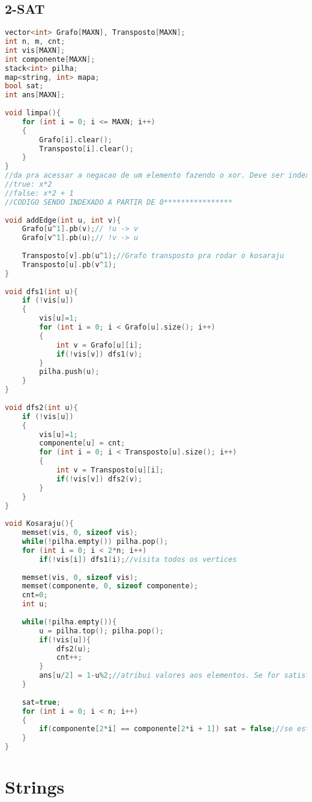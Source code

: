 \documentclass[12pt,a4paper,twoside]{report}
\begin{document}
\section{2-SAT}
\noindent\begin{lstlisting}[caption=2-SAT,language=C++]
vector<int> Grafo[MAXN], Transposto[MAXN];
int n, m, cnt;
int vis[MAXN];
int componente[MAXN];
stack<int> pilha;
map<string, int> mapa;
bool sat;
int ans[MAXN];
 
void limpa(){
    for (int i = 0; i <= MAXN; i++)
    {
        Grafo[i].clear();
        Transposto[i].clear();
    }  
}
//da pra acessar a negacao de um elemento fazendo o xor. Deve ser indexado como:
//true: x*2
//false: x*2 + 1
//CODIGO SENDO INDEXADO A PARTIR DE 0****************
 
void addEdge(int u, int v){
    Grafo[u^1].pb(v);// !u -> v
    Grafo[v^1].pb(u);// !v -> u
     
    Transposto[v].pb(u^1);//Grafo transposto pra rodar o kosaraju
    Transposto[u].pb(v^1);
}
 
void dfs1(int u){
    if (!vis[u])
    {
        vis[u]=1;
        for (int i = 0; i < Grafo[u].size(); i++)
        {
            int v = Grafo[u][i];
            if(!vis[v]) dfs1(v);
        }
        pilha.push(u);
    }  
}
 
void dfs2(int u){
    if (!vis[u])
    {
        vis[u]=1;
        componente[u] = cnt;
        for (int i = 0; i < Transposto[u].size(); i++)
        {
            int v = Transposto[u][i];
            if(!vis[v]) dfs2(v);
        }
    }  
}
 
void Kosaraju(){
    memset(vis, 0, sizeof vis);
    while(!pilha.empty()) pilha.pop();
    for (int i = 0; i < 2*n; i++)
        if(!vis[i]) dfs1(i);//visita todos os vertices
     
    memset(vis, 0, sizeof vis);
    memset(componente, 0, sizeof componente);
    cnt=0;
    int u;
     
    while(!pilha.empty()){
        u = pilha.top(); pilha.pop();
        if(!vis[u]){
            dfs2(u);
            cnt++;
        }
        ans[u/2] = 1-u%2;//atribui valores aos elementos. Se for satisfativel da pra usar esse vetor
    }
     
    sat=true;
    for (int i = 0; i < n; i++)
    {
        if(componente[2*i] == componente[2*i + 1]) sat = false;//se estão na mesma componente a formula nao tem solucao
    }  
}
\end{lstlisting}

\chapter{Strings}
\end{document}
